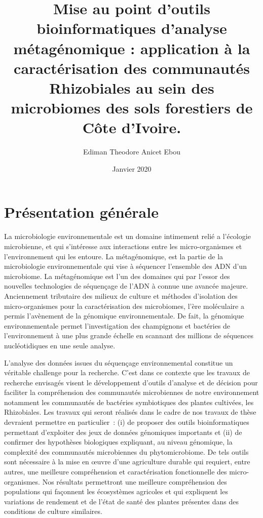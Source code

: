 \documentclass[12pt,twoside]{reedthesis}
\title{Mise au point d'outils bioinformatiques d'analyse métagénomique : application à la caractérisation des communautés Rhizobiales au sein des microbiomes des sols forestiers de Côte d'Ivoire.}
\author{Ediman Theodore Anicet Ebou}
\date{Janvier 2020}
\begin{document}
  \maketitle

\frontmatter %
\pagestyle{empty} %



  \hypersetup{linkcolor=black}
  \setcounter{tocdepth}{2}
  \tableofcontents

  \listoftables

  \listoffigures



\mainmatter %
\pagestyle{fancyplain} %

\hypertarget{pruxe9sentation-guxe9nuxe9rale}{%
\chapter*{Présentation générale}\label{pruxe9sentation-guxe9nuxe9rale}}

La microbiologie environnementale est un domaine intimement relié a l'écologie microbienne, et qui s'intéresse aux interactions entre les micro-organismes et l'environnement qui les entoure. La métagénomique, est la partie de la microbiologie environnementale qui vise à séquencer l'ensemble des ADN d'un microbiome. La métagénomique est l'un des domaines qui par l'essor des nouvelles technologies de séquençage de l'ADN à connue une avancée majeure. Anciennement tributaire des milieux de culture et méthodes d'isolation des micro-organismes pour la caractérisation des microbiomes, l'ère moléculaire a permis l'avènement de la génomique environnementale. De fait, la génomique environnementale permet l'investigation des champignons et bactéries de l'environnement à une plus grande échelle en scannant des millions de séquences nucléotidiques en une seule analyse.

L'analyse des données issues du séquençage environnemental constitue un véritable challenge pour la recherche. C'est dans ce contexte que les travaux de recherche envisagés visent le développement d'outils d'analyse et de décision pour faciliter la compréhension des communautés microbiennes de notre environnement notamment les communautés de bactéries symbiotiques des plantes cultivées, les Rhizobiales. Les travaux qui seront réalisés dans le cadre de nos travaux de thèse devraient permettre en particulier~: (i) de proposer des outils bioinformatiques permettant d'exploiter des jeux de données génomiques importants et (ii) de confirmer des hypothèses biologiques expliquant, au niveau génomique, la complexité des communautés microbiennes du phytomicrobiome. De tels outils sont nécessaire à la mise en œuvre d'une agriculture durable qui requiert, entre autres, une meilleure compréhension et caractérisation fonctionnelle des micro-organismes. Nos résultats permettront une meilleure compréhension des populations qui façonnent les écosystèmes agricoles et qui expliquent les variations de rendement et de l'état de santé des plantes présentes dans des conditions de culture similaires.
\end{document}
